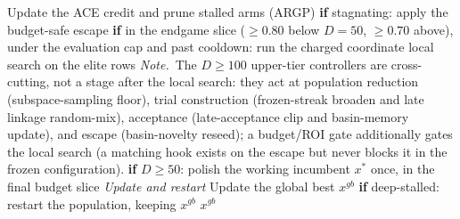 \begin{algorithm}[p]
\begin{algorithmic}[1]
  \State Update the ACE credit and prune stalled arms (ARGP)
  \State \textbf{if} stagnating: apply the budget-safe escape 
  \State \textbf{if} in the endgame slice ($\ge0.80$ below $D{=}50$, $\ge0.70$ above), under the evaluation cap and past cooldown: run the charged coordinate local search on the elite rows
  \Statex \quad\emph{Note.}~\textnormal{The $D{\ge}100$ upper-tier controllers are cross-cutting, not a stage after the local search: they act at population reduction (subspace-sampling floor), trial construction (frozen-streak broaden and late linkage random-mix), acceptance (late-acceptance clip and basin-memory update), and escape (basin-novelty reseed); a budget/ROI gate additionally gates the local search (a matching hook exists on the escape but never blocks it in the frozen configuration).}
  \State \textbf{if} $D{\ge}50$: polish the working incumbent $x^{*}$ once, in the final budget slice 
  \Statex
  \Statex \quad\emph{Update and restart}
  \State Update the global best $x^{gb}$
  \State \textbf{if} deep-stalled: restart the population, keeping $x^{gb}$
\EndWhile
\Statex
\State \Return $x^{gb}$
\end{algorithmic}
\end{algorithm}
